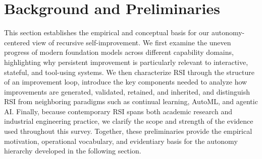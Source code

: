 \section{Background and Preliminaries}

This section establishes the empirical and conceptual basis for our
autonomy-centered view of recursive self-improvement.
We first examine the uneven progress of modern foundation models across
different capability domains, highlighting why persistent improvement is
particularly relevant to interactive, stateful, and tool-using systems.
We then characterize RSI through the structure of an improvement loop,
introduce the key components needed to analyze how improvements are generated,
validated, retained, and inherited, and distinguish RSI from neighboring
paradigms such as continual learning, AutoML, and agentic AI.
Finally, because contemporary RSI spans both academic research and industrial
engineering practice, we clarify the scope and strength of the evidence used
throughout this survey.
Together, these preliminaries provide the empirical motivation, operational
vocabulary, and evidentiary basis for the autonomy hierarchy developed in the
following section.





